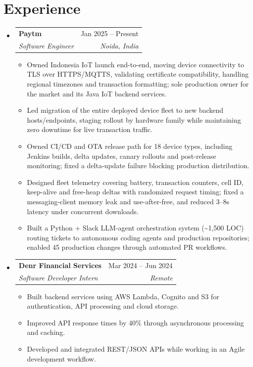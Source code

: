 \documentclass[letterpaper,10pt]{article}
\makeatletter
\newcommand{\resumeItem}[1]{
    \item\small{#1 \vspace{-2pt}}
}
\newcommand{\resumeSubheading}[4]{
    \vspace{-2pt}\item
    \begin{tabular*}{0.97\textwidth}[t]
        {l@{\extracolsep{\fill}}r}
        \textbf{#1} & #2 \\
        \textit{\small #3} & \textit{\small #4} \\
    \end{tabular*}
    \vspace{-7pt}
}
\makeatother
\begin{document}
\section{Experience}
\begin{itemize}[label={},leftmargin=0pt]

  \resumeSubheading
    {Paytm}{Jan 2025 -- Present}
    {Software Engineer}{Noida, India}

  \begin{itemize}
    \resumeItem{Owned Indonesia IoT launch end-to-end, moving device connectivity to TLS over HTTPS/MQTTS, validating certificate compatibility, handling regional timezones and transaction formatting; sole production owner for the market and its Java IoT backend services.}

    \resumeItem{Led migration of the entire deployed device fleet to new backend hosts/endpoints, staging rollout by hardware family while maintaining zero downtime for live transaction traffic.}

    \resumeItem{Owned CI/CD and OTA release path for 18 device types, including Jenkins builds, delta updates, canary rollouts and post-release monitoring; fixed a delta-update failure blocking production distribution.}

    \resumeItem{Designed fleet telemetry covering battery, transaction counters, cell ID, keep-alive and free-heap deltas with randomized request timing; fixed a messaging-client memory leak and use-after-free, and reduced 3--8s latency under concurrent downloads.}

    \resumeItem{Built a Python + Slack LLM-agent orchestration system (\textasciitilde1,500 LOC) routing tickets to autonomous coding agents and production repositories; enabled 45 production changes through automated PR workflows.}
  \end{itemize}

  \resumeSubheading
    {Denr Financial Services}{Mar 2024 -- Jun 2024}
    {Software Developer Intern}{Remote}

  \begin{itemize}
    \resumeItem{Built backend services using AWS Lambda, Cognito and S3 for authentication, API processing and cloud storage.}

    \resumeItem{Improved API response times by 40\% through asynchronous processing and caching.}

    \resumeItem{Developed and integrated REST/JSON APIs while working in an Agile development workflow.}
  \end{itemize}

\end{itemize}
\end{document}
